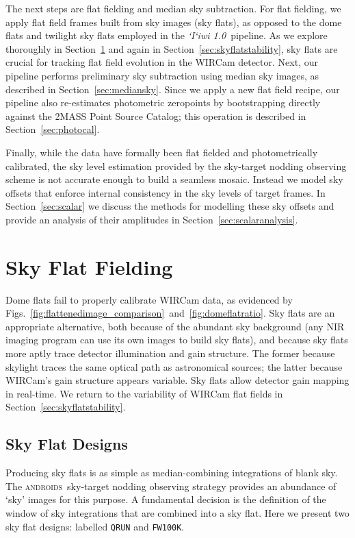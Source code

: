 \documentclass[iop]{emulateapj}
\newcommand{\sw}[1]{\textit{#1}} %
\newcommand{\iiwione}{\sw{`I`iwi 1.0}}
\newcommand{\androids}{\textsc{androids}}
\begin{document}
The next steps are flat fielding and median sky subtraction.
For flat fielding, we apply flat field frames built from sky images (sky flats), as opposed to the dome flats and twilight sky flats employed in the \iiwione\ pipeline.
As we explore thoroughly in Section~\ref{sec:flats} and again in Section~\ref{sec:skyflatstability}, sky flats are crucial for tracking flat field evolution in the WIRCam detector.
Next, our pipeline performs preliminary sky subtraction using median sky images, as described in Section~\ref{sec:mediansky}.
Since we apply a new flat field recipe, our pipeline also re-estimates photometric zeropoints by bootstrapping directly against the 2MASS Point Source Catalog; this operation is described in Section~\ref{sec:photocal}.

Finally, while the data have formally been flat fielded and photometrically calibrated, the sky level estimation provided by the sky-target nodding observing scheme is not accurate enough to build a seamless mosaic.
Instead we model sky offsets that enforce internal consistency in the sky levels of target frames.
In Section~\ref{sec:scalar} we discuss the methods for modelling these sky offsets and provide an analysis of their amplitudes in  Section~\ref{sec:scalaranalysis}.

\section{Sky Flat Fielding}
\label{sec:flats}

Dome flats fail to properly calibrate WIRCam data, as evidenced by Figs.~\ref{fig:flattenedimage_comparison}~and~\ref{fig:domeflatratio}.
Sky flats are an appropriate alternative, both because of the abundant sky background (any NIR imaging program can use its own images to build sky flats), and because sky flats more aptly trace detector illumination and gain structure.
The former because skylight traces the same optical path as astronomical sources; the latter because WIRCam's gain structure appears variable.
Sky flats allow detector gain mapping in real-time.
We return to the variability of WIRCam flat fields in Section~\ref{sec:skyflatstability}.

\subsection{Sky Flat Designs}
\label{sec:flatdesign}

Producing sky flats is as simple as median-combining integrations of blank sky. 
The \androids\ sky-target nodding observing strategy provides an abundance of `sky' images for this purpose.
A fundamental decision is the definition of the window of sky integrations that are combined into a sky flat.
Here we present two sky flat designs: labelled \texttt{QRUN} and \texttt{FW100K}.
\end{document}
